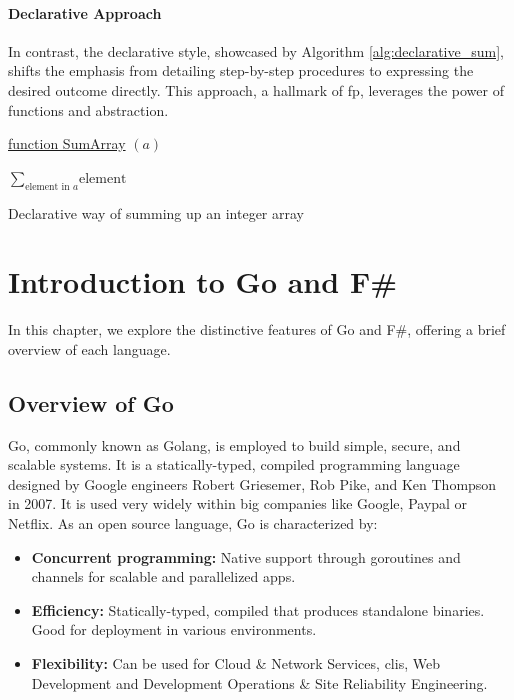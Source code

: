 \subsubsection{Declarative Approach}

In contrast, the declarative style, showcased by Algorithm \ref{alg:declarative_sum}, shifts the emphasis from detailing step-by-step procedures to expressing the desired outcome directly. This approach, a hallmark of \ac{fp}, leverages the power of functions and abstraction.

\begin{algorithm}

    \underline{function SumArray} $(a)$\;
    
    \BlankLine
    \Return $\sum_{\text{element in } a} \text{element}$
    
    \caption{Declarative way of summing up an integer array}
    \label{alg:declarative_sum}
\end{algorithm}

\chapter{Introduction to Go and F\#}\label{chap:language-comparison}
In this chapter, we explore the distinctive features of Go and F\#, offering a brief overview of each language.

    \section{Overview of Go}\label{sec:go-overview}
    Go, commonly known as Golang, is employed to build simple, secure, and scalable systems. It is a statically-typed, compiled programming language designed by Google engineers Robert Griesemer, Rob Pike, and Ken Thompson in 2007. It is used very widely within big companies like Google, Paypal or Netflix. As an open source language, Go is characterized by: 
    \begin{itemize}
        \item \textbf{Concurrent programming:}  Native support through goroutines and channels for scalable and parallelized \ac{app}s.
        \item \textbf{Efficiency:} Statically-typed, compiled that produces standalone binaries. Good for deployment in various environments.
        \item \textbf{Flexibility:} Can be used for Cloud \& Network Services, \ac{cli}s, Web Development and Development Operations \& Site Reliability Engineering.
    \end{itemize}
    \cite{GoWebsite}

